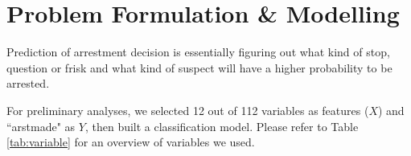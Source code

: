 \documentclass[letterpaper, twocolumn]{article}
\begin{document}
\section{Problem Formulation \& Modelling}

Prediction of arrestment decision is essentially figuring out what kind of stop, question or frisk and what kind of suspect will have a higher probability to be arrested. 

For preliminary analyses, we selected 12 out of 112 variables as features ($X$) and ``arstmade" as $Y$, then built a classification model. Please refer to Table \ref{tab:variable} for an overview of variables we used.
\end{document}
